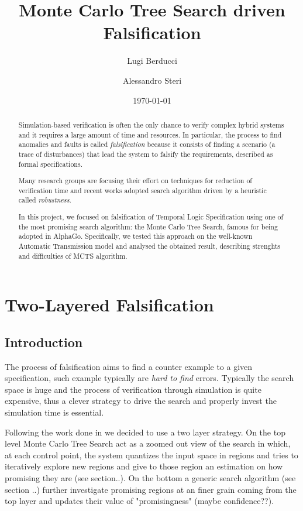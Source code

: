 \documentclass[11pt]{article}
\title{Monte Carlo Tree Search driven Falsification}
\author{Lugi Berducci \and Alessandro Steri}
\date{\today}
\begin{document}
\maketitle	


\begin{abstract}
Simulation-based verification is often the only chance to verify complex hybrid systems and it requires a large amount of time and resources.
In particular, the process to find anomalies and faults is called \textit{falsification} because it consists of finding a scenario (a trace of disturbances) that lead the system to falsify the requirements, described as formal specifications.

Many research groups are focusing their effort on techniques for reduction of verification time and recent works adopted search algorithm driven by a heuristic called \textit{robustness}.

In this project, we focused on falsification of Temporal Logic Specification using one of the most promising search algorithm: the Monte Carlo Tree Search, famous for being adopted in AlphaGo. Specifically, we tested this approach on the well-known Automatic Transmission model and analysed the obtained result, describing strenghts and difficulties of MCTS algorithm.

\end{abstract}

\tableofcontents

\pagebreak

\section{Two-Layered Falsification}
\subsection{Introduction}
The process of falsification aims to find a counter example to a given specification, such example typically are \textit{hard to find}  errors. Typically the search space is huge and the process of verification through simulation is quite expensive, thus a clever strategy to drive the search and properly invest the simulation time is essential.

Following the work done in \cite{zhang2018two} we decided to use a two layer strategy. On the top level Monte Carlo Tree Search act as a zoomed out view of the search in which, at each control point, the system quantizes the input space in regions and tries to iteratively explore new regions and give to those region an estimation on how promising they are (see section..). 
On the bottom a generic search algorithm (see section ..) further investigate promising regions at an finer grain coming from the top layer and updates their value of "promisingness" (maybe confidence??).
\end{document}
